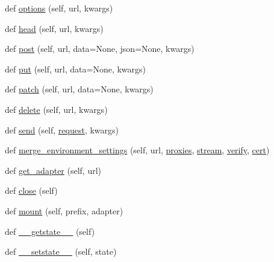 \begin{DoxyCompactItemize}
\item 
def \hyperlink{classpip_1_1__vendor_1_1requests_1_1sessions_1_1Session_a5208dc1a384e941a4435dc8376432a2a}{options} (self, url, kwargs)
\item 
def \hyperlink{classpip_1_1__vendor_1_1requests_1_1sessions_1_1Session_a79660eefa6423f4233a298039a837d92}{head} (self, url, kwargs)
\item 
def \hyperlink{classpip_1_1__vendor_1_1requests_1_1sessions_1_1Session_adc9a865f568b11d76956ebe63f38186d}{post} (self, url, data=None, json=None, kwargs)
\item 
def \hyperlink{classpip_1_1__vendor_1_1requests_1_1sessions_1_1Session_a4065df4d606c126c89467725707485c3}{put} (self, url, data=None, kwargs)
\item 
def \hyperlink{classpip_1_1__vendor_1_1requests_1_1sessions_1_1Session_ac4b46c599a30356a040031ca79025423}{patch} (self, url, data=None, kwargs)
\item 
def \hyperlink{classpip_1_1__vendor_1_1requests_1_1sessions_1_1Session_a4ef932eed98b1d51038eae97eb5caa52}{delete} (self, url, kwargs)
\item 
def \hyperlink{classpip_1_1__vendor_1_1requests_1_1sessions_1_1Session_a91945638c6510c607f67b24ad05a3275}{send} (self, \hyperlink{classpip_1_1__vendor_1_1requests_1_1sessions_1_1Session_a718b60e99280c6ef1a346cb6dc0a90c8}{request}, kwargs)
\item 
def \hyperlink{classpip_1_1__vendor_1_1requests_1_1sessions_1_1Session_a281aa976ac215f2b76d4309e4091a7a4}{merge\+\_\+environment\+\_\+settings} (self, url, \hyperlink{classpip_1_1__vendor_1_1requests_1_1sessions_1_1Session_ac1be9a4669d07d146c60ee9118f0d7da}{proxies}, \hyperlink{classpip_1_1__vendor_1_1requests_1_1sessions_1_1Session_a10665226c0b2c5be18e641d17cb06591}{stream}, \hyperlink{classpip_1_1__vendor_1_1requests_1_1sessions_1_1Session_a6f3eac9bc19bd50f242e8189c0b2fd45}{verify}, \hyperlink{classpip_1_1__vendor_1_1requests_1_1sessions_1_1Session_a20cd9cccb44cd8de5a626e4f99e468ef}{cert})
\item 
def \hyperlink{classpip_1_1__vendor_1_1requests_1_1sessions_1_1Session_a47e674b4322882dfd81238166e13eedf}{get\+\_\+adapter} (self, url)
\item 
def \hyperlink{classpip_1_1__vendor_1_1requests_1_1sessions_1_1Session_a3427c00cada3babedf0c9b24808dac6d}{close} (self)
\item 
def \hyperlink{classpip_1_1__vendor_1_1requests_1_1sessions_1_1Session_accd92e91eedda19ac042cde49548a489}{mount} (self, prefix, adapter)
\item 
def \hyperlink{classpip_1_1__vendor_1_1requests_1_1sessions_1_1Session_ad5693d3dcabd3d6616d643b7f7e1abe2}{\+\_\+\+\_\+getstate\+\_\+\+\_\+} (self)
\item 
def \hyperlink{classpip_1_1__vendor_1_1requests_1_1sessions_1_1Session_ad5f3cb728a9a82269fa45adfeb31a578}{\+\_\+\+\_\+setstate\+\_\+\+\_\+} (self, state)
\end{DoxyCompactItemize}
